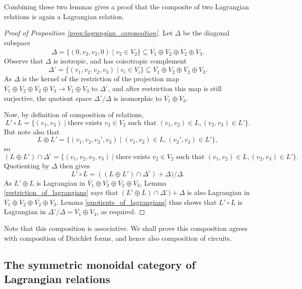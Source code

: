 Combining these two lemmas gives a proof that the composite of two Lagrangian
relations is again a Lagrangian relation.

\begin{proof}[Proof of Proposition \ref{prop:lagrangian_composition}]
  Let $\Delta$ be the diagonal subspace
  \[
    \Delta = \{(0,v_2,v_2,0) \mid v_2 \in V_2\} \subseteq \overline{V_1} \oplus
    V_2 \oplus \overline{V_2} \oplus V_3.
  \]
  Observe that $\Delta$ is isotropic, and has coisotropic complement
  \[
    \Delta^\circ = \{(v_1,v_2,v_2,v_3) \mid v_i \in V_i\} \subseteq
    \overline{V_1} \oplus V_2 \oplus \overline{V_2} \oplus V_3.
  \]
  As $\Delta$ is the kernel of the restriction of the projection map
  $\overline{V_1} \oplus V_2 \oplus \overline{V_2} \oplus V_3 \to \overline{V_1}
  \oplus V_3$ to $\Delta^\circ$, and after restriction this map is still
  surjective, the quotient space $\Delta^\circ/\Delta$ is isomorphic to
  $\overline{V_1} \oplus V_3$. 

  Now, by definition of composition of relations, 
  \[
    L' \circ L = \{(v_1,v_3) \mid \mbox{there exists } v_2 \in V_2 \mbox{ such
    that } (v_1,v_2) \in L, (v_2,v_3) \in L'\}.
  \]
  But note also that 
  \[
    L \oplus L'  = \{(v_1,v_2,v_2',v_3) \mid (v_1,v_2) \in L, (v_2',v_3) \in
    L'\},
  \]
  so 
  \[
    (L \oplus L')\cap \Delta^\circ = \{(v_1,v_2,v_2,v_3) \mid \mbox{there exists
    } v_2 \in V_2 \mbox{ such that } (v_1,v_2) \in L, (v_2,v_3) \in L'\}.
  \]
  Quotienting by $\Delta$ then gives
  \[
    L' \circ L = ((L \oplus L')\cap \Delta^\circ)+\Delta)/\Delta.
  \]
  As $L' \oplus L$ is Lagrangian in $\overline{V_1} \oplus V_2 \oplus
  \overline{V_2} \oplus V_3$, Lemma \ref{restriction_of_lagrangians} says that
  $(L' \oplus L)\cap \Delta^\circ)+\Delta$ is also Lagrangian in $\overline{V_1}
  \oplus V_2 \oplus \overline{V_2} \oplus V_3$. Lemma
  \ref{quotients_of_lagrangians} thus shows that $L' \circ L$ is Lagrangian in
  $\Delta^\circ/\Delta = \overline{V_1} \oplus V_3$, as required.
\end{proof}

Note that this composition is associative. We shall prove this composition
agrees with composition of Dirichlet forms, and hence also composition of
circuits. 

\subsection{The symmetric monoidal category of Lagrangian relations}

